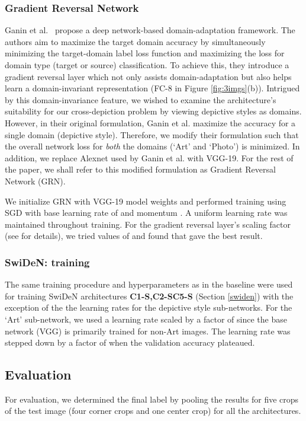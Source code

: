 \documentclass[preprint]{sig-alternate-05-2015}
\begin{document}
\subsubsection{Gradient Reversal Network}
\label{grn}

Ganin et al.~\cite{ganin2015unsupervised} propose a deep network-based domain-adaptation framework. The authors aim to maximize the target domain accuracy by simultaneously minimizing the target-domain label loss function and maximizing the loss for domain type (target or source) classification. To achieve this, they introduce a gradient reversal layer which not only assists domain-adaptation but also helps learn a domain-invariant representation (FC-8 in Figure \ref{fig:3imgs}(b)). Intrigued by this domain-invariance feature, we wished to examine the architecture's suitability for our cross-depiction problem by viewing depictive styles as domains. However, in their original formulation, Ganin et al. maximize the accuracy for a single domain (depictive style). Therefore, we modify their formulation such that the overall network loss for \textit{both} the domains (`Art' and `Photo') is minimized. In addition, we replace Alexnet used by Ganin et al. with VGG-19. For the rest of the paper, we shall refer to this modified formulation as Gradient Reversal Network (GRN). 

We initialize GRN with VGG-19 model weights and performed training using SGD with base learning rate of  and momentum . A uniform learning rate was maintained throughout training. For the gradient reversal layer's scaling factor  (see \cite{ganin2015unsupervised} for details), we tried values of  and  found that  gave the best result.  

\subsubsection{SwiDeN: training}
\label{swtr}

The same training procedure and hyperparameters as in the baseline were used for training SwiDeN architectures \textbf{C1-S,C2-S}\textbf{C5-S} (Section \ref{swiden}) with the exception of the the learning rates for the depictive style sub-networks. For the `Art' sub-network, we used a learning rate scaled by a factor of  since the base network (VGG) is primarily trained for non-Art images. The learning rate was stepped down by a factor of  when the validation accuracy plateaued.

\subsection{Evaluation}
For evaluation, we determined the final label by  pooling the results for five crops of the test image (four corner crops and one center crop) for all the architectures.
\end{document}
